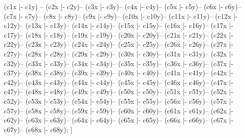 {	(c1x |- c1y) -- (c2x |- c2y)-- (c3x |- c3y)-- (c4x |- c4y)-- (c5x |- c5y)-- (c6x |- c6y)-- (c7x |- c7y)-- (c8x |- c8y)-- (c9x |- c9y)-- (c10x |- c10y)-- (c11x |- c11y)-- (c12x |- c12y)-- (c13x |- c13y)-- (c14x |- c14y)-- (c15x |- c15y)-- (c16x |- c16y)-- (c17x |- c17y)-- (c18x |- c18y)-- (c19x |- c19y)-- (c20x |- c20y)-- (c21x |- c21y)-- (c22x |- c22y)-- (c23x |- c23y)-- (c24x |- c24y)-- (c25x |- c25y)-- (c26x |- c26y)-- (c27x |- c27y)-- (c28x |- c28y)-- (c29x |- c29y)-- (c30x |- c30y)-- (c31x |- c31y)-- (c32x |- c32y)-- (c33x |- c33y)-- (c34x |- c34y)-- (c35x |- c35y)-- (c36x |- c36y)-- (c37x |- c37y)-- (c38x |- c38y)-- (c39x |- c39y)-- (c40x |- c40y)-- (c41x |- c41y)-- (c42x |- c42y)-- (c43x |- c43y)-- (c44x |- c44y)-- (c45x |- c45y)-- (c46x |- c46y)-- (c47x |- c47y)-- (c48x |- c48y)-- (c49x |- c49y)-- (c50x |- c50y)-- (c51x |- c51y)-- (c52x |- c52y)-- (c53x |- c53y)-- (c54x |- c54y)-- (c55x |- c55y)-- (c56x |- c56y)-- (c57x |- c57y)-- (c58x |- c58y)-- (c59x |- c59y)-- (c60x |- c60y)-- (c61x |- c61y)-- (c62x |- c62y)-- (c63x |- c63y)-- (c64x |- c64y)-- (c65x |- c65y)-- (c66x |- c66y)-- (c67x |- c67y)-- (c68x |- c68y);
	}
]

